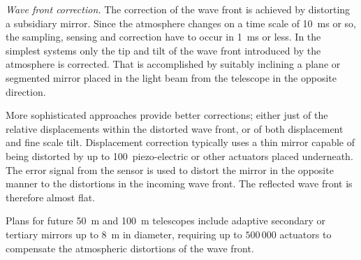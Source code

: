 \noindent
{\it Wave front correction.} The correction of the wave front is achieved
by distorting a subsidiary mirror. Since the atmosphere changes on a time
scale of 10~ms or so, the sampling, sensing and correction have to occur in
1~ms or less. In the simplest systems only the tip and tilt of the wave
front introduced by the atmosphere is corrected. That is accomplished by 
suitably inclining a plane or segmented mirror placed in the light beam
from the telescope in the opposite direction. 

More sophisticated approaches provide better corrections; either just
of the relative displacements within the distorted wave front, or of both
displacement and fine scale tilt. Displacement correction typically uses
a thin mirror capable of being distorted by up to 100~piezo-electric or other
actuators placed underneath. The error signal from the sensor is used to
distort the mirror in the opposite manner to the distortions in the incoming
wave front. The reflected wave front is therefore almost flat.

Plans for future 50~m and 100~m telescopes include adaptive secondary or
tertiary mirrors up to 8~m in diameter, requiring up to $500\,000$ actuators
to compensate the atmospheric distortions of the wave front.

%
